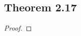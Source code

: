\documentclass[../../main.tex]{subfiles}
\begin{document}
\subsection{Theorem 2.17}
\begin{wts}

\end{wts}
\begin{proof}

\end{proof}
\end{document}
